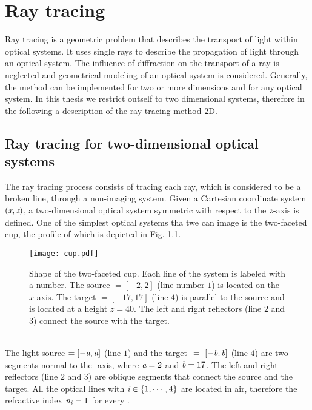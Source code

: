 \chapter{Ray tracing}
Ray tracing is a geometric problem that describes the transport of light within optical systems.
It uses single rays to describe the propagation of light through an optical system.
The influence of diffraction on the transport of a ray is neglected and geometrical modeling of an optical system is considered.
Generally, the method can be implemented for two or more dimensions and for any optical system.
In this thesis we restrict outself to two dimensional systems, therefore in the following a description of the ray tracing method  $2$D.
\section{Ray tracing for two-dimensional optical systems}
The ray tracing process consists of tracing each ray, which is considered to be a broken line, through a non-imaging system.
Given a Cartesian coordinate system $(\textit{x}, \textit{z})$, a two-dimensional optical system symmetric with respect to the $\textit{z}$-axis is defined.
One of the simplest optical systems tha twe can image is the two-faceted cup, the profile of which is depicted in Fig. \ref{figure:cup}.
\begin{figure}[h]
\label{figure:cup}
  \begin{center}
  \texttt{[image: cup.pdf]}
  \end{center}
  \caption{\footnotesize{Shape of the two-faceted cup.  Each line of the system is labeled with a number.
   The source $= [-2,2]$ (line number $1$) is located on the $x$-axis.
   The target $= [-17, 17]$ (line $4$) is parallel to the source and is located at a height $ z= 40$.
   The left and right reflectors (line $2$ and $3$) connect the source with the target.}}
  \label{figure:cup}
\end{figure}
\\ \indent The light source $= [-\textit{a}, \textit{a}]$ (line $1$) and the target $~=~ [-\textit{b}, \textit{b}]$ (line $4$) are two segments normal to the -axis, where $\textit{a}=2$ and $\textit{b}=17$.
The left and right reflectors (line $2$ and $3$) are oblique segments that connect the source and the target.
All the optical lines  with $\textit{i} \in \{1, \cdots, 4\}$ are located in air, therefore the refractive index $\textit{n}_{\textit{i}}=1$ for every .
